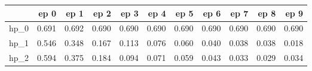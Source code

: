 \begin{tabular}{lrrrrrrrrrr}
\toprule
{} &   ep 0 &   ep 1 &   ep 2 &   ep 3 &   ep 4 &   ep 5 &   ep 6 &   ep 7 &   ep 8 &   ep 9 \\
\midrule
hp\_0 &  0.691 &  0.692 &  0.690 &  0.690 &  0.690 &  0.690 &  0.690 &  0.690 &  0.690 &  0.690 \\
hp\_1 &  0.546 &  0.348 &  0.167 &  0.113 &  0.076 &  0.060 &  0.040 &  0.038 &  0.038 &  0.018 \\
hp\_2 &  0.594 &  0.375 &  0.184 &  0.094 &  0.071 &  0.059 &  0.043 &  0.033 &  0.029 &  0.034 \\
\bottomrule
\end{tabular}
